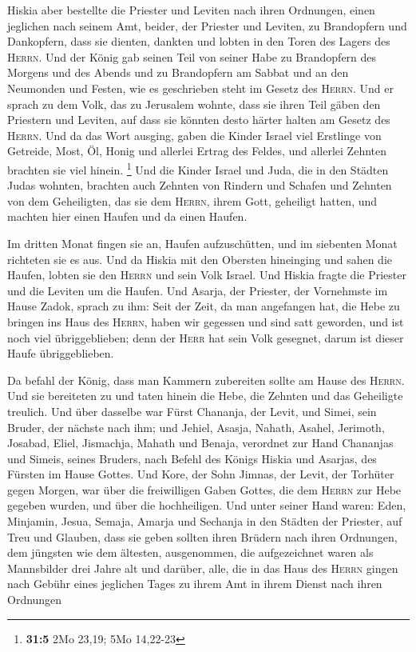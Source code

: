  Hiskia aber bestellte die Priester und Leviten nach ihren
Ordnungen, einen jeglichen nach seinem Amt, beider, der Priester und
Leviten, zu Brandopfern und Dankopfern, dass sie dienten, dankten und
lobten in den Toren des Lagers des \textsc{Herrn}.  Und
der König gab seinen Teil von seiner Habe zu Brandopfern des Morgens und
des Abends und zu Brandopfern am Sabbat und an den Neumonden und Festen,
wie es geschrieben steht im Gesetz des \textsc{Herrn}. 
Und er sprach zu dem Volk, das zu Jerusalem wohnte, dass sie ihren Teil
gäben den Priestern und Leviten, auf dass sie könnten desto härter
halten am Gesetz des \textsc{Herrn}.  Und da das Wort
ausging, gaben die Kinder Israel viel Erstlinge von Getreide, Most, Öl,
Honig und allerlei Ertrag des Feldes, und allerlei Zehnten brachten sie
viel hinein. \footnote{\textbf{31:5} 2Mo 23,19; 5Mo 14,22-23}
 Und die Kinder Israel und Juda, die in den Städten Judas
wohnten, brachten auch Zehnten von Rindern und Schafen und Zehnten von
dem Geheiligten, das sie dem \textsc{Herrn}, ihrem Gott, geheiligt
hatten, und machten hier einen Haufen und da einen Haufen.

 Im dritten Monat fingen sie an, Haufen aufzuschütten, und
im siebenten Monat richteten sie es aus.  Und da Hiskia
mit den Obersten hineinging und sahen die Haufen, lobten sie den
\textsc{Herrn} und sein Volk Israel.  Und Hiskia fragte
die Priester und die Leviten um die Haufen.  Und Asarja,
der Priester, der Vornehmste im Hause Zadok, sprach zu ihm: Seit der
Zeit, da man angefangen hat, die Hebe zu bringen ins Haus des
\textsc{Herrn}, haben wir gegessen und sind satt geworden, und ist noch
viel übriggeblieben; denn der \textsc{Herr} hat sein Volk gesegnet,
darum ist dieser Haufe übriggeblieben.

 Da befahl der König, dass man Kammern zubereiten sollte
am Hause des \textsc{Herrn}. Und sie bereiteten zu  und
taten hinein die Hebe, die Zehnten und das Geheiligte treulich. Und über
dasselbe war Fürst Chananja, der Levit, und Simei, sein Bruder, der
nächste nach ihm;  und Jehiel, Asasja, Nahath, Asahel,
Jerimoth, Josabad, Eliel, Jismachja, Mahath und Benaja, verordnet zur
Hand Chananjas und Simeis, seines Bruders, nach Befehl des Königs Hiskia
und Asarjas, des Fürsten im Hause Gottes.  Und Kore, der
Sohn Jimnas, der Levit, der Torhüter gegen Morgen, war über die
freiwilligen Gaben Gottes, die dem \textsc{Herrn} zur Hebe gegeben
wurden, und über die hochheiligen.  Und unter seiner Hand
waren: Eden, Minjamin, Jesua, Semaja, Amarja und Sechanja in den Städten
der Priester, auf Treu und Glauben, dass sie geben sollten ihren Brüdern
nach ihren Ordnungen, dem jüngsten wie dem ältesten, 
ausgenommen, die aufgezeichnet waren als Mannsbilder drei Jahre alt und
darüber, alle, die in das Haus des \textsc{Herrn} gingen nach Gebühr
eines jeglichen Tages zu ihrem Amt in ihrem Dienst nach ihren Ordnungen

